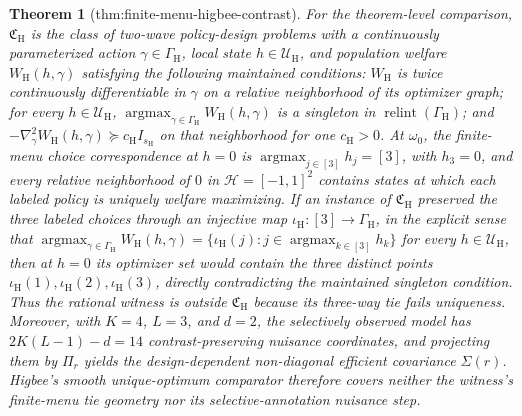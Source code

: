 \documentclass{article}
\newtheorem{theorem}{Theorem}
\begin{document}
\begin{theorem}[thm:finite-menu-higbee-contrast]\label{thm:finite-menu-higbee-contrast}
For the theorem-level comparison, \(\mathfrak C_{\mathrm H}\) is the class of two-wave policy-design problems with a continuously parameterized action \(\gamma\in\Gamma_{\mathrm H}\), local state \(h\in\mathcal U_{\mathrm H}\), and population welfare \(W_{\mathrm H}(h,\gamma)\) satisfying the following maintained conditions: \(W_{\mathrm H}\) is twice continuously differentiable in \(\gamma\) on a relative neighborhood of its optimizer graph; for every \(h\in\mathcal U_{\mathrm H}\), \(\operatorname*{argmax}_{\gamma\in\Gamma_{\mathrm H}}W_{\mathrm H}(h,\gamma)\) is a singleton in \(\operatorname{relint}(\Gamma_{\mathrm H})\); and \(-\nabla_{\gamma}^2W_{\mathrm H}(h,\gamma)\succeq c_{\mathrm H}I_{s_{\mathrm H}}\) on that neighborhood for one \(c_{\mathrm H}>0\). At \(\omega_0\), the finite-menu choice correspondence at \(h=0\) is \(\operatorname*{argmax}_{j\in[3]}h_j=[3]\), with \(h_3=0\), and every relative neighborhood of \(0\) in \(\mathcal H=[-1,1]^2\) contains states at which each labeled policy is uniquely welfare maximizing. If an instance of \(\mathfrak C_{\mathrm H}\) preserved the three labeled choices through an injective map \(\iota_{\mathrm H}:[3]\to\Gamma_{\mathrm H}\), in the explicit sense that \(\operatorname*{argmax}_{\gamma\in\Gamma_{\mathrm H}}W_{\mathrm H}(h,\gamma)=\{\iota_{\mathrm H}(j):j\in\operatorname*{argmax}_{k\in[3]}h_k\}\) for every \(h\in\mathcal U_{\mathrm H}\), then at \(h=0\) its optimizer set would contain the three distinct points \(\iota_{\mathrm H}(1),\iota_{\mathrm H}(2),\iota_{\mathrm H}(3)\), directly contradicting the maintained singleton condition. Thus the rational witness is outside \(\mathfrak C_{\mathrm H}\) because its three-way tie fails uniqueness. Moreover, with \(K=4\), \(L=3\), and \(d=2\), the selectively observed model has \(2K(L-1)-d=14\) contrast-preserving nuisance coordinates, and projecting them by \(\Pi_r\) yields the design-dependent non-diagonal efficient covariance \(\Sigma(r)\). Higbee's smooth unique-optimum comparator therefore covers neither the witness's finite-menu tie geometry nor its selective-annotation nuisance step.
\end{theorem}
\end{document}
